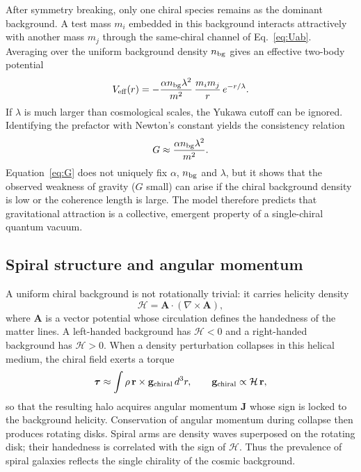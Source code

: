 \documentclass[a4paper,10pt]{article}
\begin{document}
After symmetry breaking, only one chiral species remains as the dominant
background. A test mass $m_i$ embedded in this background interacts
attractively with another mass $m_j$ through the same-chiral channel of
Eq.~\eqref{eq:Uab}. Averaging over the uniform background density $n_{\rm bg}$
gives an effective two-body potential
\begin{equation}
V_{\rm eff}(r)=
-\frac{\alpha n_{\rm bg}\lambda^2}{m^2}\,
\frac{m_i m_j}{r}\,e^{-r/\lambda}.
\label{eq:Veff}
\end{equation}
If $\lambda$ is much larger than cosmological scales, the Yukawa cutoff can be
ignored. Identifying the prefactor with Newton's constant yields the
consistency relation
\begin{equation}
G \approx \frac{\alpha n_{\rm bg}\lambda^2}{m^2}.
\label{eq:G}
\end{equation}
Equation~\eqref{eq:G} does not uniquely fix $\alpha$, $n_{\rm bg}$ and
$\lambda$, but it shows that the observed weakness of gravity ($G$ small) can
arise if the chiral background density is low or the coherence length is
large. The model therefore predicts that gravitational attraction is a
collective, emergent property of a single-chiral quantum vacuum.

\subsection{Spiral structure and angular momentum}

A uniform chiral background is not rotationally trivial: it carries helicity
density
\begin{equation}
\mathcal{H}=\mathbf{A}\cdot(\nabla\times\mathbf{A}),
\label{eq:helicity}
\end{equation}
where $\mathbf{A}$ is a vector potential whose circulation defines the
handedness of the matter lines. A left-handed background has $\mathcal{H}<0$
and a right-handed background has $\mathcal{H}>0$. When a density perturbation
collapses in this helical medium, the chiral field exerts a torque
\begin{equation}
\boldsymbol{\tau}\approx\int\rho\,\mathbf{r}\times
\mathbf{g}_{\rm chiral}\,d^3r,
\qquad
\mathbf{g}_{\rm chiral}\propto\mathcal{H}\,\mathbf{r},
\label{eq:torque}
\end{equation}
so that the resulting halo acquires angular momentum $\mathbf{J}$ whose sign
is locked to the background helicity. Conservation of angular momentum during
collapse then produces rotating disks. Spiral arms are density waves
\cite{linshu} superposed on the rotating disk; their handedness is correlated
with the sign of $\mathcal{H}$. Thus the prevalence of spiral galaxies
reflects the single chirality of the cosmic background.
\end{document}
